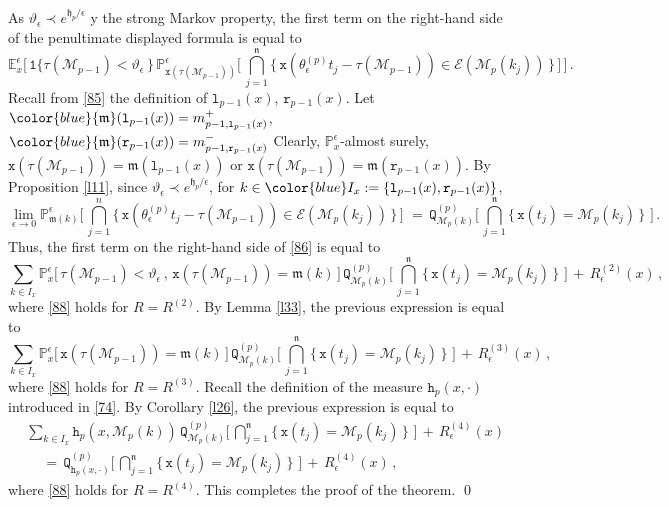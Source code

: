 \documentclass[reqno]{amsart}
\theoremstyle{plain}
\theoremstyle{definition}
\newcommand{\mf}[1]{{\mathfrak #1}}
\newcommand{\bb}[1]{{\mathbb #1}}
\newcommand{\ms}[1]{{\mathscr #1}}
\newcommand{\mtt}[1]{{\mathtt #1}}
\newcounter{as}[section]
\newcommand{\<}{\langle}
\renewcommand{\>}{\rangle}
\begin{document}
As $\vartheta_\epsilon \prec e^{\mf h_{p}/\epsilon} $ y the strong
Markov property, the first term on the right-hand side of the
penultimate displayed formula is equal to
\begin{equation*}
\bb E^\epsilon_x\Big[\,
\mtt 1\big\{ \tau(\ms M_{p-1}) < \vartheta_\epsilon\,\big\}  \,
\bb P^\epsilon_{\mtt x(\tau(\ms M_{p-1}))} \Big[\,
\bigcap_{j=1}^{\mf n} \Big\{\, \mtt x (\theta_{\epsilon}^{(p)}
t_{j} - \tau(\ms M_{p-1}) ) \in
\ms E (\ms M_p(k_j))\,\Big\}\,\Big]\, \Big]\,. 
\end{equation*}
Recall from \eqref{85} the definition of $\mtt l_{p-1}(x)$,
$\mtt r_{p-1}(x)$. Let
$\color{blue} \mf m(\mtt l_{p-1}(x)) = m^+_{p-1, \mtt l_{p-1}(x)}$,
$\color{blue} \mf m(\mtt r_{p-1}(x)) = m^-_{p-1, \mtt r_{p-1}(x)}$
Clearly, $\bb P^\epsilon_x$-almost surely,
$\mtt x (\tau(\ms M_{p-1})) = \mf m(\mtt l_{p-1}(x))$ or
$\mtt x (\tau(\ms M_{p-1})) = \mf m(\mtt r_{p-1}(x))$. By Proposition
\ref{l11}, since $\vartheta_\epsilon \prec e^{\mf h_{p}/\epsilon}$,
for $k\in {\color{blue} I_x  :=\{\mtt l_{p-1}(x), \mtt r_{p-1}(x) \}}$,
\begin{equation*}
\lim_{\epsilon\to 0}
\bb P^\epsilon_{\mf m (k)} \Big[\,
\bigcap_{j=1}^{n} \Big\{\, \mtt x (\theta_{\epsilon}^{(p)}
t_{j} - \tau(\ms M_{p-1}) ) \in
\ms E (\ms M_p(k_j))\,\Big\}\,\Big]\,
\,=\, \mtt Q^{(p)}_{\ms M_p(k)}
\big[\, \bigcap_{j=1}^{{\mf n}}
\big\{ \, \mtt x (t_{j}) = \ms M_p(k_j) \, \} \, \, \big]
\,. 
\end{equation*}
Thus, the first term on the right-hand side of \eqref{86} is equal to
\begin{equation*}
\sum_{k\in I_x} \bb P^\epsilon_x\big[\,
\tau(\ms M_{p-1}) < \vartheta_\epsilon \,,\,
\mtt x(\tau(\ms M_{p-1})) = \mf m(k) \,\big]\,
\mtt Q^{(p)}_{\ms M_p(k)}
\big[\, \bigcap_{j=1}^{{\mf n}}
\big\{ \, \mtt x (t_{j}) = \ms M_p(k_j) \, \} \, \, \big]
\,+\, R^{(2)}_\epsilon (x) \,,
\end{equation*}
where \eqref{88} holds for $R=R^{(2)}$. By Lemma \ref{l33}, the
previous expression is equal to
\begin{equation*}
\sum_{k\in I_x} \bb P^\epsilon_x\big[\,
\mtt x(\tau(\ms M_{p-1})) = \mf m(k) \,\big]\,
\mtt Q^{(p)}_{\ms M_p(k)}
\big[\, \bigcap_{j=1}^{{\mf n}}
\big\{ \, \mtt x (t_{j}) = \ms M_p(k_j) \, \} \, \, \big]
\,+\, R^{(3)}_\epsilon (x) \,,
\end{equation*}
where \eqref{88} holds for $R=R^{(3)}$. Recall the definition of the
measure $\mtt h_p(x, \cdot)$ introduced in \eqref{74}. By Corollary
\ref{l26}, the previous expression is equal to
\begin{equation*}
\begin{aligned}
& \sum_{k\in I_x} \mtt h_p(x, \ms M_p(k))\,
\mtt Q^{(p)}_{\ms M_p(k)}
\big[\, \bigcap_{j=1}^{{\mf n}}
\big\{ \, \mtt x (t_{j}) = \ms M_p(k_j) \, \} \, \, \big]
\,+\, R^{(4)}_\epsilon (x)
\\
& \quad 
\,=\,
\mtt Q^{(p)}_{\mtt h_p(x, \cdot) }
\big[\, \bigcap_{j=1}^{{\mf n}}
\big\{ \, \mtt x (t_{j}) = \ms M_p(k_j) \, \} \, \, \big]
\,+\, R^{(4)}_\epsilon (x)
\,,
\end{aligned}
\end{equation*}
where \eqref{88} holds for $R=R^{(4)}$. This completes the proof of
the theorem. \qed
\end{document}
